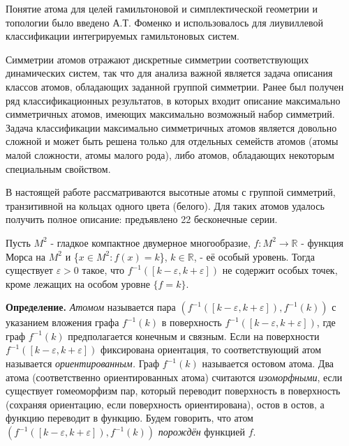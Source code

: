\vzmscaption

Понятие атома для целей гамильтоновой и симплектической геометрии и топологии было введено А.Т. Фоменко и использовалось для лиувиллевой классификации интегрируемых гамильтоновых систем.


Симметрии атомов отражают дискретные симметрии соответствующих динамических систем, так что для анализа важной является задача описания классов атомов, обладающих заданной группой симметрии. Ранее был получен ряд классификационных результатов, в которых входит описание максимально симметричных атомов, имеющих максимально возможный набор симметрий. Задача классификации максимально симметричных атомов является довольно сложной и может быть решена только для отдельных семейств атомов (атомы малой сложности, атомы малого рода), либо атомов, обладающих некоторым специальным свойством.

В настоящей работе рассматриваются высотные атомы с группой симметрий, транзитивной на кольцах одного цвета (белого). Для таких атомов удалось получить полное описание: предъявлено 22 бесконечные серии.




Пусть $M^2$ - гладкое компактное двумерное многообразие, $f:M^2 \to \mathbb{R}$ - функция Морса	на $M^2$ и \{$x\in M^2 \colon f(x)=k $\}, $k \in \mathbb{R}$, - её особый уровень. Тогда существует ${\varepsilon > 0}$ такое, что ${f^{-1}([k-\varepsilon, k+\varepsilon ])}$ не содержит особых точек, кроме лежащих на особом уровне $\{f=k\}$.



		{\bf Определение.}
		{\em Атомом} называется пара ${(f^{-1}([k-\varepsilon, k+\varepsilon ]), f^{-1}(k))}$ с указанием вложения графа ${f^{-1}(k)}$ в поверхность ${f^{-1}([k-\varepsilon, k+\varepsilon ])}$, где граф ${f^{-1}(k)}$ предполагается конечным и связным. Если на поверхности ${f^{-1}([k-\varepsilon, k+\varepsilon ])}$ фиксирована ориентация, то соответствующий атом называется {\em ориентированным.} Граф ${f^{-1}(k)}$ называется остовом атома. Два атома (соответственно ориентированных атома) считаются {\em изоморфными}, если существует гомеоморфизм пар, который переводит поверхность в поверхность (сохраняя ориентацию, если поверхность ориентирована), остов в остов, а функцию переводит в функцию. Будем говорить, что атом
${(f^{-1}([k-\varepsilon, k+\varepsilon ]),f^{-1}(k))}$ {\em порождён} функцией $f$.




